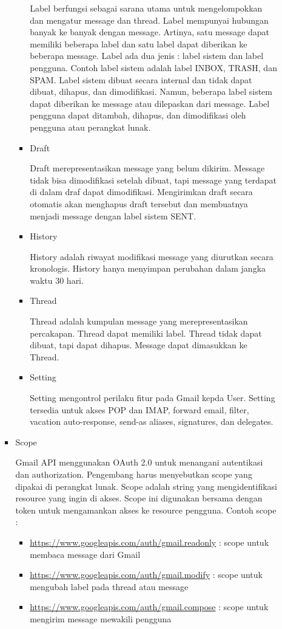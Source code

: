\documentclass[a4paper,twoside]{article}
\begin{document}
\begin{enumerate}
\begin{itemize}
\begin{itemize}
\begin{itemize}
				Label berfungsi sebagai sarana utama untuk mengelompokkan dan mengatur message dan thread. Label mempunyai hubungan banyak ke banyak dengan message. Artinya, satu message dapat memiliki beberapa label dan satu label dapat diberikan ke beberapa message.
				Label ada dua jenis : label sistem dan label pengguna. Contoh label sistem adalah label INBOX, TRASH, dan SPAM. Label sistem dibuat secara internal dan tidak dapat dibuat, dihapus, dan dimodifikasi. Namun, beberapa label sistem dapat diberikan ke message atau dilepaskan dari message. Label pengguna dapat ditambah, dihapus, dan dimodifikasi oleh pengguna atau perangkat lunak.
				
				\item Draft
				
				Draft merepresentasikan message yang belum dikirim. Message tidak bisa dimodifikasi setelah dibuat, tapi message yang terdapat di dalam draf dapat dimodifikasi. Mengirimkan draft secara otomatis akan menghapus draft tersebut dan membuatnya menjadi message dengan label sistem SENT.
				
				\item History
				
				History adalah riwayat modifikasi message yang diurutkan secara kronologis. History hanya menyimpan perubahan dalam jangka waktu 30 hari.
				
				\item Thread
				
				Thread adalah kumpulan message yang merepresentasikan percakapan. Thread dapat memiliki label. Thread tidak dapat dibuat, tapi dapat dihapus. Message dapat dimasukkan ke Thread.
				
				\item Setting
				
				Setting mengontrol perilaku fitur pada Gmail kepda User. Setting tersedia untuk akses POP dan IMAP, forward email, filter, vacation auto-response, send-as aliases, signatures, dan delegates.
				
			\end{itemize}
			
			\item Scope
			
			Gmail API menggunakan OAuth 2.0 untuk menangani autentikasi dan authorization. Pengembang harus menyebutkan scope yang dipakai di perangkat lunak. Scope adalah string yang mengidentifikasi resource yang ingin di akses. Scope ini digunakan bersama dengan token untuk mengamankan akses ke resource pengguna. Contoh scope :
			\begin{itemize}
				\item \url{https://www.googleapis.com/auth/gmail.readonly} : scope untuk membaca message dari Gmail
				\item \url{https://www.googleapis.com/auth/gmail.modify} : scope untuk mengubah label pada thread atau message
				\item \url{https://www.googleapis.com/auth/gmail.compose} : scope untuk mengirim message mewakili pengguna
			\end{itemize}
			

\end{itemize}
\end{itemize}
\end{enumerate}
\end{document}
